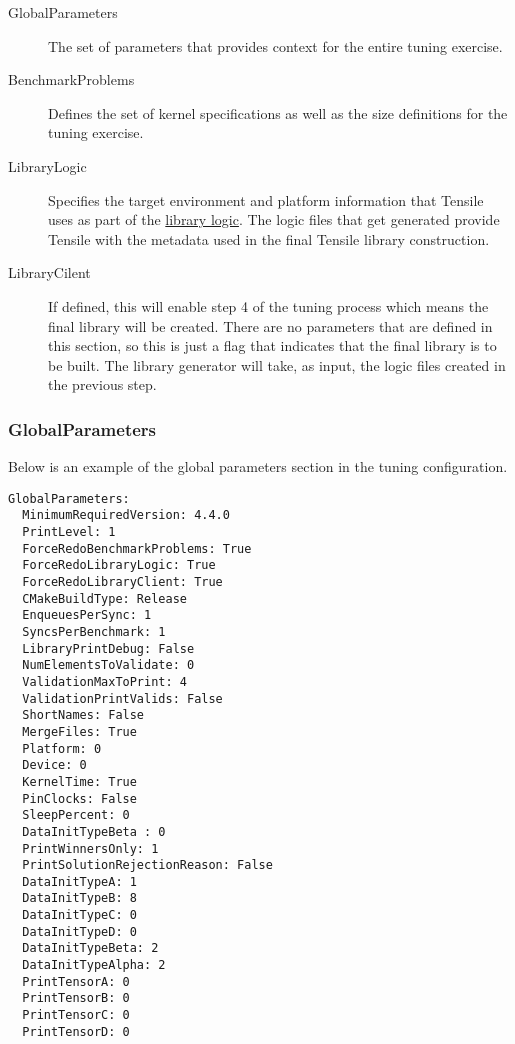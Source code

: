 \documentclass[]{article}
\begin{document}
\begin{description}
\item[GlobalParameters] The set of parameters that provides context for the entire tuning exercise.
\item[BenchmarkProblems] Defines the set of kernel specifications as well as the size definitions for the tuning exercise.
\item[LibraryLogic] Specifies the target environment and platform information that Tensile uses as part of the \hyperref[sec:LibraryLogic]{library logic}. The logic files that get generated provide Tensile with the metadata used in the final Tensile library construction.
\item[LibraryCilent] If defined, this will enable step 4 of the tuning process which means the final library will be created. There are no parameters that are defined in this section, so this is just a flag that indicates that the final library is to be built. The library generator will take, as input, the logic files created in the previous step.
\end{description}

\subsubsection{GlobalParameters}

\noindent
Below is an example of the global parameters section in the tuning configuration.

\begin{verbatim}
GlobalParameters:
  MinimumRequiredVersion: 4.4.0
  PrintLevel: 1
  ForceRedoBenchmarkProblems: True
  ForceRedoLibraryLogic: True
  ForceRedoLibraryClient: True
  CMakeBuildType: Release
  EnqueuesPerSync: 1
  SyncsPerBenchmark: 1
  LibraryPrintDebug: False
  NumElementsToValidate: 0
  ValidationMaxToPrint: 4
  ValidationPrintValids: False
  ShortNames: False
  MergeFiles: True
  Platform: 0
  Device: 0
  KernelTime: True
  PinClocks: False
  SleepPercent: 0
  DataInitTypeBeta : 0
  PrintWinnersOnly: 1
  PrintSolutionRejectionReason: False
  DataInitTypeA: 1
  DataInitTypeB: 8
  DataInitTypeC: 0
  DataInitTypeD: 0
  DataInitTypeBeta: 2
  DataInitTypeAlpha: 2
  PrintTensorA: 0
  PrintTensorB: 0
  PrintTensorC: 0
  PrintTensorD: 0
\end{verbatim}
\end{document}
